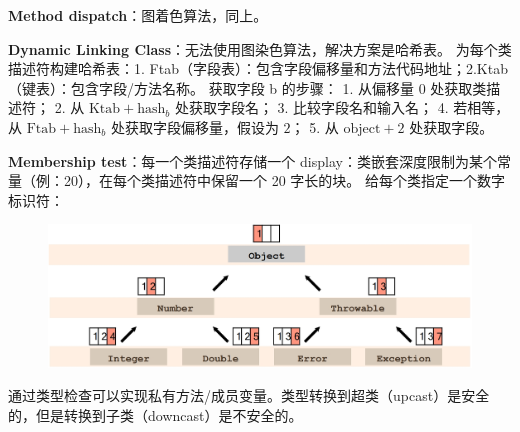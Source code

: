 \par \noindent \textbf{Method dispatch}：图着色算法，同上。

\par \noindent \textbf{Dynamic Linking Class}：无法使用图染色算法，解决方案是哈希表。
为每个类描述符构建哈希表：1. Ftab（字段表）：包含字段偏移量和方法代码地址；2.Ktab（键表）：包含字段/方法名称。
获取字段 b 的步骤：
1. 从偏移量 0 处获取类描述符；
2. 从 $\text{Ktab} + \text{hash}_b$ 处获取字段名；
3. 比较字段名和输入名；
4. 若相等，从 $\text{Ftab} + \text{hash}_b$ 处获取字段偏移量，假设为 $2$；
5. 从 $\text{object} + 2$ 处获取字段。

\par \noindent \textbf{Membership test}：每一个类描述符存储一个 display：类嵌套深度限制为某个常量（例：20），在每个类描述符中保留一个 20 字长的块。
给每个类指定一个数字标识符：

\begin{figure}[H]
    \centering
    \includegraphics[width=0.8\linewidth]{figures/oop3.png}
\end{figure}

\par \noindent 通过类型检查可以实现私有方法/成员变量。类型转换到超类（upcast）是安全的，但是转换到子类（downcast）是不安全的。